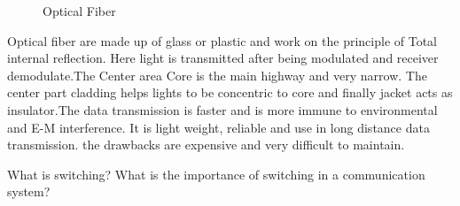 \documentclass[a4paper,12pt]{article}
\begin{document}
\begin{A}
{\begin{enumerate}
\begin{figure}[h]
\caption{Optical Fiber}
\end{figure}
Optical fiber are made up of glass or plastic and work on the principle of Total internal reflection. Here light is transmitted after being modulated and  receiver demodulate.The Center area Core is the main highway and very narrow. The center part cladding helps lights to be concentric to core and finally jacket acts as insulator.The data transmission is faster and is more immune to environmental and E-M interference. It is light weight, reliable and use in long distance data transmission. the drawbacks are expensive and very difficult to maintain.
\end{enumerate}
}
\end{A}




\begin{Q}
{
What is switching? What is the importance of switching in a communication system?}

\end{Q}
\end{document}
